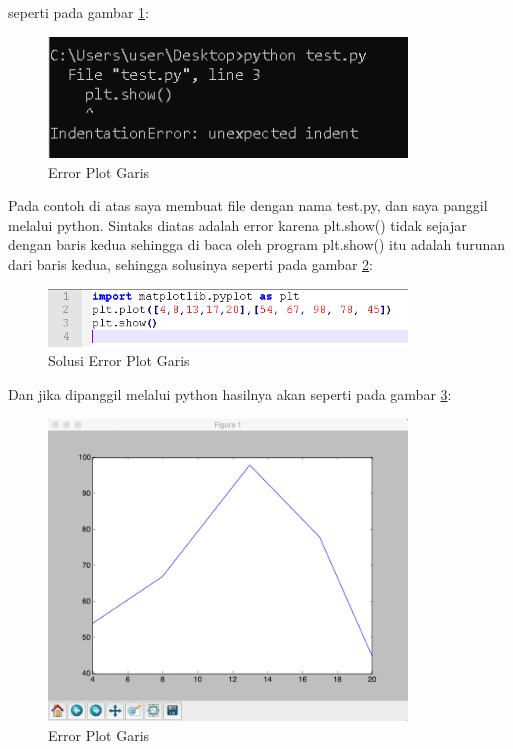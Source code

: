 seperti pada gambar \ref{fig:errpltgrs}:
\begin{figure}[!htbp]
	\centerline{\includegraphics[width=0.85\textwidth]{figures/6/errpltgrs.PNG}}
	\caption{Error Plot Garis}
	\label{fig:errpltgrs}
\end{figure}            

Pada contoh di atas saya membuat file dengan nama test.py, dan saya panggil melalui python. Sintaks diatas adalah error karena plt.show() tidak sejajar dengan baris kedua sehingga di baca oleh program plt.show() itu adalah turunan dari baris kedua, sehingga solusinya seperti pada gambar \ref{fig:solepg}:
\begin{figure}[!htbp]
	\centerline{\includegraphics[width=0.85\textwidth]{figures/6/solepg.PNG}}
	\caption{Solusi Error Plot Garis}
	\label{fig:solepg}
\end{figure}            

Dan jika dipanggil melalui python hasilnya akan seperti pada gambar \ref{fig:erpg}:
\begin{figure}[!htbp]
	\centerline{\includegraphics[width=0.85\textwidth]{figures/6/erpg.PNG}}
	\caption{Error Plot Garis}
	\label{fig:erpg}
\end{figure}       

